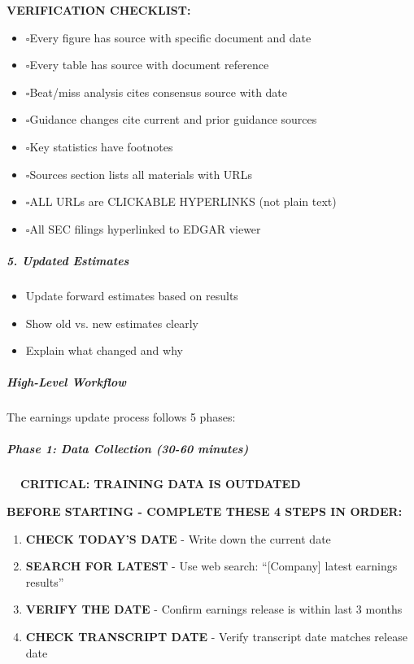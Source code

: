 \documentclass[11pt]{article}
\newcommand{\UncheckedBox}{$\square$}
\begin{document}
\textbf{VERIFICATION CHECKLIST:}

\begin{itemize}[leftmargin=*,itemsep=2pt,topsep=2pt]
\item {} \UncheckedBox Every figure has source with specific document and date
\item {} \UncheckedBox Every table has source with document reference
\item {} \UncheckedBox Beat/miss analysis cites consensus source with date
\item {} \UncheckedBox Guidance changes cite current and prior guidance sources
\item {} \UncheckedBox Key statistics have footnotes
\item {} \UncheckedBox Sources section lists all materials with URLs
\item {} \UncheckedBox ALL URLs are CLICKABLE HYPERLINKS (not plain text)
\item {} \UncheckedBox All SEC filings hyperlinked to EDGAR viewer
\end{itemize}

\subparagraph{5. Updated Estimates}\mbox{}\par
\begin{itemize}[leftmargin=*,itemsep=2pt,topsep=2pt]
\item {} Update forward estimates based on results
\item {} Show old vs. new estimates clearly
\item {} Explain what changed and why
\end{itemize}

\subparagraph{High-Level Workflow}\mbox{}\par

The earnings update process follows 5 phases:


\subparagraph{Phase 1: Data Collection (30-60 minutes)}\mbox{}\par

\textbf{🚨🚨🚨 CRITICAL: TRAINING DATA IS OUTDATED 🚨🚨🚨}


\textbf{BEFORE STARTING - COMPLETE THESE 4 STEPS IN ORDER:}

\begin{enumerate}[leftmargin=*,itemsep=2pt,topsep=2pt]
\item {} \textbf{CHECK TODAY'S DATE} - Write down the current date
\item {} \textbf{SEARCH FOR LATEST} - Use web search: ``[Company] latest earnings results''
\item {} \textbf{VERIFY THE DATE} - Confirm earnings release is within last 3 months
\item {} \textbf{CHECK TRANSCRIPT DATE} - Verify transcript date matches release date
\end{enumerate}
\end{document}
